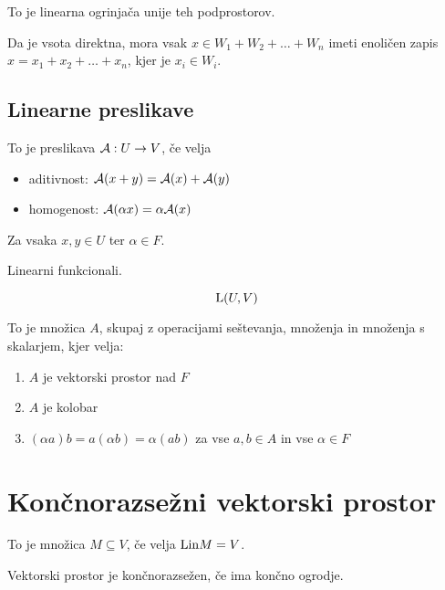 To je linearna ogrinjača unije teh podprostorov.

Da je vsota direktna, mora vsak $x \in W_1+W_2+\ldots+W_n$ imeti enoličen zapis $x = x_1 + x_2 + \ldots + x_n$, kjer je $x_i \in W_i$.

\subsection{Linearne preslikave}


To je preslikava $\mathcal{A}: U\to V$, če velja
\begin{itemize}
	\item aditivnost: $\mathcal{A} (x+y) = \mathcal{A}(x) + \mathcal{A}(y)$
	\item homogenost: $\mathcal{A}(\alpha x) = \alpha \mathcal{A}(x)$
\end{itemize}

Za vsaka $x,y \in U$ ter $\alpha \in F$.


Linearni funkcionali.


\[
	\text{L}(U, V)
\]


To je množica $A$, skupaj z operacijami seštevanja, množenja in množenja s skalarjem, kjer velja:

\begin{enumerate}
	\item $A$ je vektorski prostor nad $F$
	\item $A$ je kolobar
	\item $(\alpha a)b = a(\alpha b) = \alpha (ab)$ za vse $a,b \in A$ in vse $\alpha \in F$
\end{enumerate}

\section{Končnorazsežni vektorski prostor}


To je množica $M \subseteq V$, če velja $\text{Lin} M = V$.

Vektorski prostor je končnorazsežen, če ima končno ogrodje.